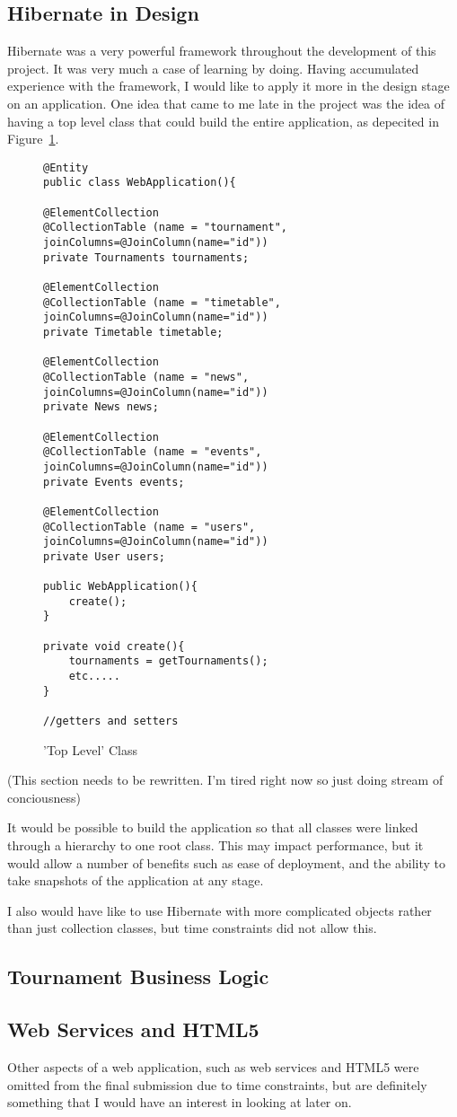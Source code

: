 \subsection{Hibernate in Design}
Hibernate was a very powerful framework throughout the development of this project. It was very much a case of learning by doing. Having accumulated experience with the framework, I would like to apply it more in the design stage on an application. One idea that came to me late in the project was the idea of having a top level class that could build the entire application, as depecited in Figure~\ref{fig:toplevel}.

\begin{figure}[H]
\begin{lstlisting}
@Entity
public class WebApplication(){

@ElementCollection
@CollectionTable (name = "tournament", joinColumns=@JoinColumn(name="id"))
private Tournaments tournaments;

@ElementCollection
@CollectionTable (name = "timetable", joinColumns=@JoinColumn(name="id"))
private Timetable timetable;

@ElementCollection
@CollectionTable (name = "news", joinColumns=@JoinColumn(name="id"))
private News news;

@ElementCollection
@CollectionTable (name = "events", joinColumns=@JoinColumn(name="id"))
private Events events;

@ElementCollection
@CollectionTable (name = "users", joinColumns=@JoinColumn(name="id"))
private User users;

public WebApplication(){
	create();
}

private void create(){
	tournaments = getTournaments();
	etc.....
}

//getters and setters

\end{lstlisting}
\caption{'Top Level' Class}
\label{fig:toplevel}
\end{figure}

(This section needs to be rewritten. I'm tired right now so just doing stream of conciousness) 

It would be possible to build the application so that all classes were linked through a hierarchy to one root class. This may impact performance, but it would allow a number of benefits such as ease of deployment, and the ability to take snapshots of the application at any stage.

I also would have like to use Hibernate with more complicated objects rather than just collection classes, but time constraints did not allow this.

\subsection{Tournament Business Logic}

\subsection{Web Services and HTML5}
Other aspects of a web application, such as web services and HTML5 were omitted from the final submission due to time constraints, but are definitely something that I would have an interest in looking at later on.